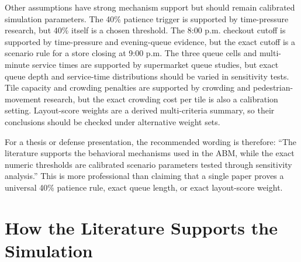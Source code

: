 \documentclass[12pt]{article}
\begin{document}
Other assumptions have strong mechanism support but should remain calibrated simulation parameters. The 40\% patience trigger is supported by time-pressure research, but 40\% itself is a chosen threshold. The 8:00 p.m. checkout cutoff is supported by time-pressure and evening-queue evidence, but the exact cutoff is a scenario rule for a store closing at 9:00 p.m. The three queue cells and multi-minute service times are supported by supermarket queue studies, but exact queue depth and service-time distributions should be varied in sensitivity tests. Tile capacity and crowding penalties are supported by crowding and pedestrian-movement research, but the exact crowding cost per tile is also a calibration setting. Layout-score weights are a derived multi-criteria summary, so their conclusions should be checked under alternative weight sets.

For a thesis or defense presentation, the recommended wording is therefore: ``The literature supports the behavioral mechanisms used in the ABM, while the exact numeric thresholds are calibrated scenario parameters tested through sensitivity analysis.'' This is more professional than claiming that a single paper proves a universal 40\% patience rule, exact queue length, or exact layout-score weight.

\section{How the Literature Supports the Simulation}
\end{document}
